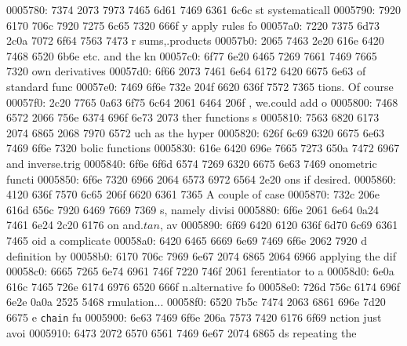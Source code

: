 \begin{bo
00010e0: 7865 647d 5c62 6567 696e 7b76 6572 6261  xed}
\begin{verba
00010f0: 7469 6d7d 0a20 2023 7479 7065 2074 6572  tim}
\begin{
0001c40: 7665 7262 6174 696d 7d0a 2020 236c 6574  verbatim}
\begin{boxe
00027a0: 647d 5c62 6567 696e 7b76 6572 6261 7469  d}
\begin{verbati
00027b0: 6d7d 0a20 2023 6c65 7420 696e 6669 7865  m}
\begin{v
0002c60: 6572 6261 7469 6d7d 0a20 2023 6c65 7420  erbatim}
\begin{
0002dc0: 7665 7262 6174 696d 7d0a 2020 236c 6574  verbatim}
\begin{boxed
0002f30: 7d5c 6265 6769 6e7b 7665 7262 6174 696d  }
\begin{verbatim
0002f40: 7d0a 2020 236c 6574 2068 6428 683a 3a74  }
\begin{v
0003e60: 6572 6261 7469 6d7d 0a20 2023 236f 7065  erbatim}
\begin{boxed
00042b0: 7d5c 6265 6769 6e7b 7665 7262 6174 696d  }
\begin{verbatim
00042c0: 7d0a 2020 2328 782c 7429 3b3b 0a20 202d  }
\begin{boxed}
\begin{boxed}
0005780: 7374 2073 7973 7465 6d61 7469 6361 6c6c  st systematicall
0005790: 7920 6170 706c 7920 7275 6c65 7320 666f  y apply rules fo
00057a0: 7220 7375 6d73 2c0a 7072 6f64 7563 7473  r sums,.products
00057b0: 2065 7463 2e20 616e 6420 7468 6520 6b6e   etc. and the kn
00057c0: 6f77 6e20 6465 7269 7661 7469 7665 7320  own derivatives 
00057d0: 6f66 2073 7461 6e64 6172 6420 6675 6e63  of standard func
00057e0: 7469 6f6e 732e 204f 6620 636f 7572 7365  tions. Of course
00057f0: 2c20 7765 0a63 6f75 6c64 2061 6464 206f  , we.could add o
0005800: 7468 6572 2066 756e 6374 696f 6e73 2073  ther functions s
0005810: 7563 6820 6173 2074 6865 2068 7970 6572  uch as the hyper
0005820: 626f 6c69 6320 6675 6e63 7469 6f6e 7320  bolic functions 
0005830: 616e 6420 696e 7665 7273 650a 7472 6967  and inverse.trig
0005840: 6f6e 6f6d 6574 7269 6320 6675 6e63 7469  onometric functi
0005850: 6f6e 7320 6966 2064 6573 6972 6564 2e20  ons if desired. 
0005860: 4120 636f 7570 6c65 206f 6620 6361 7365  A couple of case
0005870: 732c 206e 616d 656c 7920 6469 7669 7369  s, namely divisi
0005880: 6f6e 2061 6e64 0a24 7461 6e24 2c20 6176  on and.$tan$, av
0005890: 6f69 6420 6120 636f 6d70 6c69 6361 7465  oid a complicate
00058a0: 6420 6465 6669 6e69 7469 6f6e 2062 7920  d definition by 
00058b0: 6170 706c 7969 6e67 2074 6865 2064 6966  applying the dif
00058c0: 6665 7265 6e74 6961 746f 7220 746f 2061  ferentiator to a
00058d0: 6e0a 616c 7465 726e 6174 6976 6520 666f  n.alternative fo
00058e0: 726d 756c 6174 696f 6e2e 0a0a 2525 5468  rmulation...%
00058f0: 6520 7b5c 7474 2063 6861 696e 7d20 6675  e {\tt chain} fu
0005900: 6e63 7469 6f6e 206a 7573 7420 6176 6f69  nction just avoi
0005910: 6473 2072 6570 6561 7469 6e67 2074 6865  ds repeating the

\end{boxed}
\end{boxed}
\end{verbatim
00042c0: 7d0a 2020 2328 782c 7429 3b3b 0a20 202d  }
\end{boxed
00042b0: 7d5c 6265 6769 6e7b 7665 7262 6174 696d  }
\end{v
0003e60: 6572 6261 7469 6d7d 0a20 2023 236f 7065  erbatim}
\end{verbatim
0002f40: 7d0a 2020 236c 6574 2068 6428 683a 3a74  }
\end{boxed
0002f30: 7d5c 6265 6769 6e7b 7665 7262 6174 696d  }
\end{
0002dc0: 7665 7262 6174 696d 7d0a 2020 236c 6574  verbatim}
\end{v
0002c60: 6572 6261 7469 6d7d 0a20 2023 6c65 7420  erbatim}
\end{verbati
00027b0: 6d7d 0a20 2023 6c65 7420 696e 6669 7865  m}
\end{boxe
00027a0: 647d 5c62 6567 696e 7b76 6572 6261 7469  d}
\end{
0001c40: 7665 7262 6174 696d 7d0a 2020 236c 6574  verbatim}
\end{verba
00010f0: 7469 6d7d 0a20 2023 7479 7065 2074 6572  tim}
\end{bo
00010e0: 7865 647d 5c62 6567 696e 7b76 6572 6261  xed}
